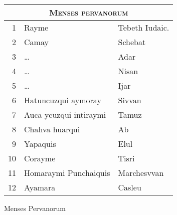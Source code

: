 %
\begin{tabnums} %
\normalsize
\centering
\newcommand{\hts}{\scriptsize}
%
\newcommand{\hsb}[1]{\small{#1}}
\begin{tabular}{@{} r l l @{}}
\toprule
\multicolumn{3}{c}{\Large\textsc{Menses pervanorum}} \\
\toprule
 1 & Rayme                  & Tebeth Iudaic. \\
 2 & Camay                  & Schebat \\
 3 & \ldots                 & Adar \\
 4 & \ldots                 & Nisan \\
 5 & \ldots                 & Ijar \\
 6 & Hatuncuzqui aymoray    & Sivvan \\
 7 & Auca ycuzqui intiraymi & Tamuz \\
 8 & Chahva huarqui         & Ab \\
 9 & Yapaquis               & Elul \\
10 & Corayme                & Tisri \\
11 & Homaraymi Punchaiquis  & Marchesvvan \\
12 & Ayamara                & Casleu \\
\bottomrule
\end{tabular}
%
\caption{Menses Pervanorum}
\label{tab:p171}
%
\end{tabnums}
